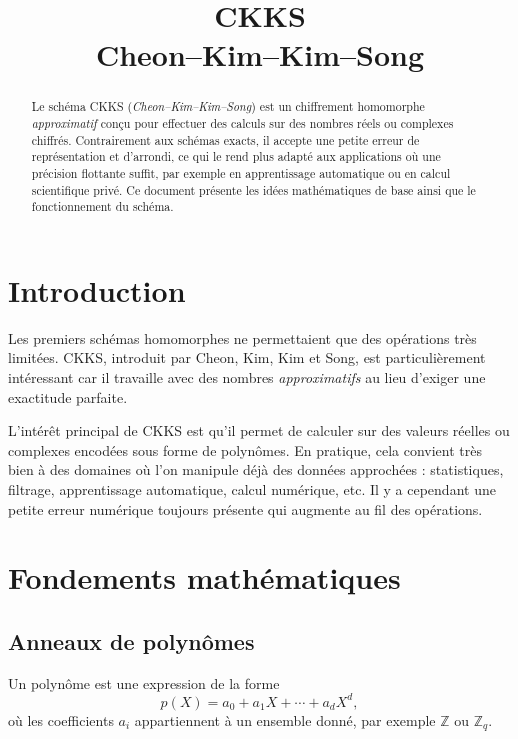 \documentclass[11pt,a4paper]{article}
\title{\textbf{CKKS}\\
\large Cheon--Kim--Kim--Song}
\begin{document}
\maketitle

\begin{abstract}
Le schéma CKKS (\emph{Cheon--Kim--Kim--Song}) est un chiffrement homomorphe \emph{approximatif} conçu pour effectuer des calculs sur des nombres réels ou complexes chiffrés. Contrairement aux schémas exacts, il accepte une petite erreur de représentation et d'arrondi, ce qui le rend plus adapté aux applications où une précision flottante suffit, par exemple en apprentissage automatique ou en calcul scientifique privé.
Ce document présente les idées mathématiques de base ainsi que le fonctionnement du schéma.
\end{abstract}

\tableofcontents
\newpage

\section{Introduction}

Les premiers schémas homomorphes ne permettaient que des opérations très limitées. CKKS, introduit par Cheon, Kim, Kim et Song, est particulièrement intéressant car il travaille avec des nombres \emph{approximatifs} au lieu d'exiger une exactitude parfaite.

L'intérêt principal de CKKS est qu'il permet de calculer sur des valeurs réelles ou complexes encodées sous forme de polynômes. En pratique, cela convient très bien à des domaines où l'on manipule déjà des données approchées : statistiques, filtrage, apprentissage automatique, calcul numérique, etc. Il y a cependant une petite erreur numérique toujours présente qui augmente au fil des opérations.

\section{Fondements mathématiques}

\subsection{Anneaux de polynômes}

Un polynôme est une expression de la forme
\[
p(X)=a_0+a_1X+\cdots+a_dX^d,
\]
où les coefficients $a_i$ appartiennent à un ensemble donné, par exemple $\mathbb{Z}$ ou $\mathbb{Z}_q$.
\end{document}
